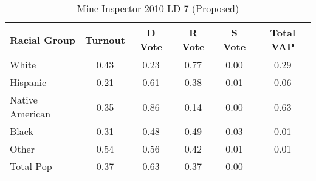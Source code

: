 \begin{table}[htb]
\begin{center}
\caption{Mine Inspector 2010 LD 7 (Proposed)}
\label{smine_vap_ld_7}
\begin{tabular}{lccccc}
  \hline
Racial Group & Turnout & D Vote & R Vote & S Vote & Total VAP \\ 
  \hline
White & 0.43 & 0.23 & 0.77 & 0.00 & 0.29 \\ 
  Hispanic & 0.21 & 0.61 & 0.38 & 0.01 & 0.06 \\ 
  Native American & 0.35 & 0.86 & 0.14 & 0.00 & 0.63 \\ 
  Black & 0.31 & 0.48 & 0.49 & 0.03 & 0.01 \\ 
  Other & 0.54 & 0.56 & 0.42 & 0.01 & 0.01 \\ 
  Total Pop & 0.37 & 0.63 & 0.37 & 0.00 &  \\ 
   \hline
\end{tabular}
\end{center}
\end{table}
